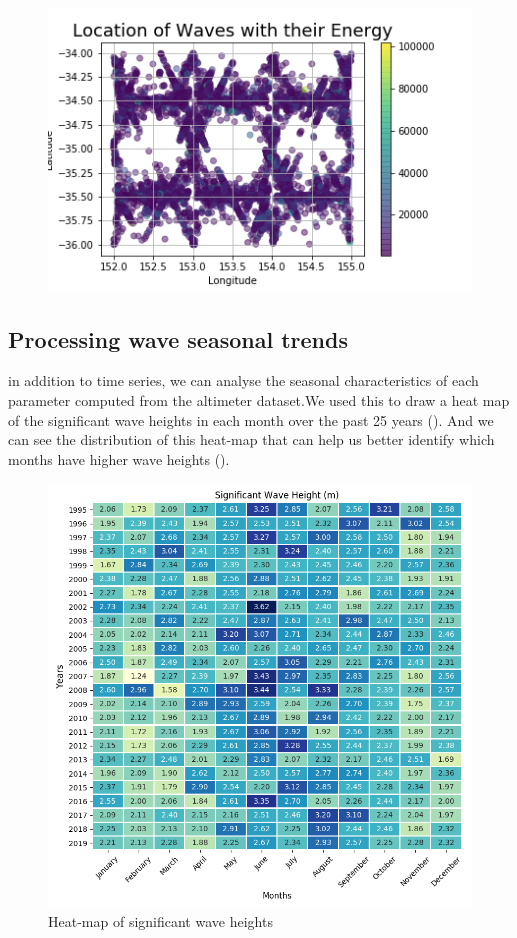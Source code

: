 \documentclass[12pt]{article}
\begin{document}
\begin{figure}[h]
    \centering
    \includegraphics[scale=0.45]{wave_location.png}
    \caption{}
    \label{fig:fig4}
\end{figure}

\newpage

\subsection{Processing wave seasonal trends}
in addition to time series, we can analyse the seasonal characteristics of each parameter computed from the altimeter dataset.We used this to draw a heat map of the significant wave heights in each month over the past 25 years (). And we can see the distribution of this heat-map that can help us better identify which months have higher wave heights (). 

\begin{figure}[h]
    \centering
    \includegraphics[width=10 cm]{whall_wh_heatmap.png}
    \caption{Heat-map of significant wave heights}
    \label{fig:fig5}
\end{figure}
\end{document}
